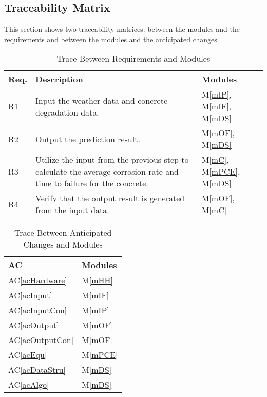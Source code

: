 \documentclass[12pt, titlepage]{article}
\newcommand{\acref}[1]{AC\ref{#1}}
\newcommand{\mref}[1]{M\ref{#1}}
\begin{document}
\begin{description}
\section{Traceability Matrix} \label{SecTM}

This section shows two traceability matrices: between the modules and the
requirements and between the modules and the anticipated changes.

\begin{table}[H]
\centering
\begin{tabular}{p{} p{} p{}}
\toprule
\textbf{Req.} & \textbf{Description} & \textbf{Modules}\\
\midrule
R1 & Input the weather data and concrete degradation data. & \mref{mIP}, \mref{mIF}, \mref{mDS}\\
R2 & Output the prediction result. &\mref{mOF}, \mref{mDS}\\
R3 & Utilize the input from the previous step to calculate the average corrosion rate and time to failure for the concrete. &\mref{mC}, \mref{mPCE}, \mref{mDS}\\
R4 & Verify that the output result is generated from the input data. &\mref{mOF}, \mref{mC}\\

\bottomrule
\end{tabular}
\caption{Trace Between Requirements and Modules}
\label{TblRT}
\end{table}

\begin{table}[H]
\centering
\begin{tabular}{p{} p{}}
\toprule
\textbf{AC} & \textbf{Modules}\\
\midrule
\acref{acHardware} & \mref{mHH}\\
\acref{acInput} & \mref{mIF}\\
\acref{acInputCon} & \mref{mIP}\\
\acref{acOutput} & \mref{mOF}\\
\acref{acOutputCon} & \mref{mOF}\\
\acref{acEqu} & \mref{mPCE}\\
\acref{acDataStru} & \mref{mDS}\\
\acref{acAlgo} & \mref{mDS}\\

\bottomrule
\end{tabular}
\caption{Trace Between Anticipated Changes and Modules}
\label{TblACT}
\end{table}


\end{description}
\end{document}
